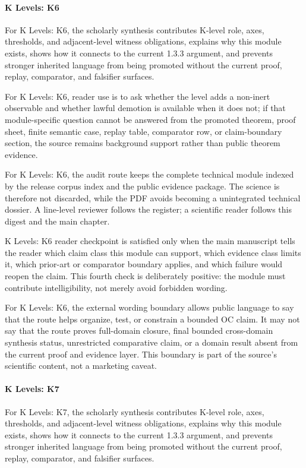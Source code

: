 \paragraph{K Levels: K6}

For K Levels: K6, the scholarly synthesis contributes K-level role, axes, thresholds, and adjacent-level witness obligations, explains why this module exists, shows how it connects to the current 1.3.3 argument, and prevents stronger inherited language from being promoted without the current proof, replay, comparator, and falsifier surfaces.


For K Levels: K6, reader use is to ask whether the level adds a non-inert observable and whether lawful demotion is available when it does not; if that module-specific question cannot be answered from the promoted theorem, proof sheet, finite semantic case, replay table, comparator row, or claim-boundary section, the source remains background support rather than public theorem evidence.


For K Levels: K6, the audit route keeps the complete technical module indexed by the release corpus index and the public evidence package. The science is therefore not discarded, while the PDF avoids becoming a unintegrated technical dossier. A line-level reviewer follows the register; a scientific reader follows this digest and the main chapter.


K Levels: K6 reader checkpoint is satisfied only when the main manuscript tells the reader which claim class this module can support, which evidence class limits it, which prior-art or comparator boundary applies, and which failure would reopen the claim. This fourth check is deliberately positive: the module must contribute intelligibility, not merely avoid forbidden wording.


For K Levels: K6, the external wording boundary allows public language to say that the route helps organize, test, or constrain a bounded OC claim. It may not say that the route proves full-domain closure, final bounded cross-domain synthesis status, unrestricted comparative claim, or a domain result absent from the current proof and evidence layer. This boundary is part of the source's scientific content, not a marketing caveat.


\paragraph{K Levels: K7}

For K Levels: K7, the scholarly synthesis contributes K-level role, axes, thresholds, and adjacent-level witness obligations, explains why this module exists, shows how it connects to the current 1.3.3 argument, and prevents stronger inherited language from being promoted without the current proof, replay, comparator, and falsifier surfaces.


